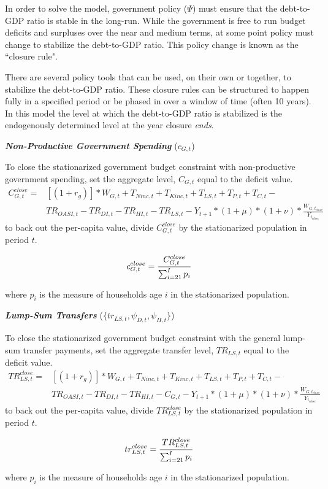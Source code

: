 \documentclass[11pt,leqno,fleqn]{article}
\newcommand{\be}{\vspace{-1em}\begin{singlespace}\begin{equation}}
\newcommand{\ee}{\end{equation}\end{singlespace}}
\begin{document}
In order to solve the model, government policy ($\Psi$) must ensure that the debt-to-GDP ratio is stable in the long-run. While the government is free to run budget deficits and surpluses over the near and medium terms, at some point policy must change to stabilize the debt-to-GDP ratio. This policy change is known as the ``closure rule".

There are several policy tools that can be used, on their own or together, to stabilize the debt-to-GDP ratio. These closure rules can be structured to happen fully in a specified period or be phased in over a window of time (often 10 years). In this model the level at which the debt-to-GDP ratio is stabilized is the endogenously determined level at the year closure \textit{ends}.

\begin{flushleft}
\textbf{\textit{Non-Productive Government Spending}} ($c_{G,t}$)
\end{flushleft}
To close the stationarized government budget constraint with non-productive government spending, set the aggregate level, $C_{G,t}$ equal to the deficit value.
\begin{align*}
C_{G,t}^{close} = &[(1+r_g)]*W_{G,t} + T_{Ninc,t} + T_{Kinc,t} + T_{LS,t} + T_{P,t} + T_{C,t} - \\
&TR_{OASI,t} - TR_{DI,t} - TR_{HI,t} - TR_{LS,t} - Y_{t+1}*(1+\mu)*(1+\nu)*\frac{W_{G,t_{close}}}{Y_{t_{close}}}
\end{align*}
to back out the per-capita value, divide $C_{G,t}^{close}$ by the stationarized population in period $t$.
\be c_{G,t}^{close} = \frac{C_{G,t}^{close}}{\sum_{i=21}^I p_i} \notag \ee
where $p_i$ is the measure of households age $i$ in the stationarized population.


\begin{flushleft}
\textbf{\textit{Lump-Sum Transfers}} ($\{tr_{LS,t},\psi_{D,t},\psi_{H,t}\}$)
\end{flushleft}
To close the stationarized government budget constraint with the general lump-sum transfer payments, set the aggregate transfer level, $TR_{LS,t}$ equal to the deficit value.
\begin{align*}
TR_{LS,t}^{close} = &[(1+r_g)]*W_{G,t} + T_{Ninc,t} + T_{Kinc,t} + T_{LS,t} + T_{P,t} + T_{C,t} - \\
&TR_{OASI,t} - TR_{DI,t} - TR_{HI,t} - C_{G,t} - Y_{t+1}*(1+\mu)*(1+\nu)*\frac{W_{G,t_{close}}}{Y_{t_{close}}}
\end{align*}
to back out the per-capita value, divide $TR_{LS,t}^{close}$ by the stationarized population in period $t$.
\be tr_{LS,t}^{close} = \frac{TR_{LS,t}^{close}}{\sum_{i=21}^I p_i} \notag \ee
where $p_i$ is the measure of households age $i$ in the stationarized population.
\end{document}
